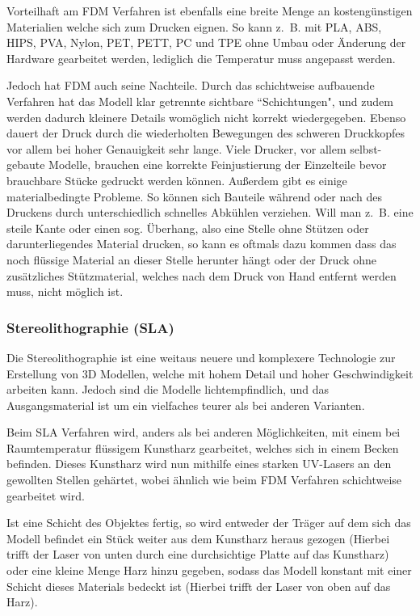 Vorteilhaft am FDM Verfahren ist ebenfalls eine breite Menge an kostengünstigen Materialien welche sich zum Drucken eignen. So kann z.~B. mit PLA, ABS, HIPS, PVA, Nylon, PET, PETT, PC und TPE \parencite{MATERIALS} ohne Umbau oder Änderung der Hardware gearbeitet werden, lediglich die Temperatur muss angepasst werden.

Jedoch hat FDM auch seine Nachteile.
Durch das schichtweise aufbauende Verfahren hat das Modell klar getrennte sichtbare \textquotedblleft Schichtungen", und zudem werden dadurch kleinere Details womöglich nicht korrekt wiedergegeben. Ebenso dauert der Druck durch die wiederholten Bewegungen des schweren Druckkopfes vor allem bei hoher Genauigkeit sehr lange. Viele Drucker, vor allem selbst-gebaute Modelle, brauchen eine korrekte Feinjustierung der Einzelteile bevor brauchbare Stücke gedruckt werden können. Außerdem gibt es einige materialbedingte Probleme. So können sich Bauteile während oder nach des Druckens durch unterschiedlich schnelles Abkühlen verziehen. Will man z.~B. eine steile Kante oder einen sog. Überhang, also eine Stelle ohne Stützen oder darunterliegendes Material drucken, so kann es oftmals dazu kommen dass das noch flüssige Material an dieser Stelle herunter hängt oder der Druck ohne zusätzliches Stützmaterial, welches nach dem Druck von Hand entfernt werden muss, nicht möglich ist. \parencite[Informationen aus:][]{FDMDetail,DRUCKVERFAHREN}

\subsubsection{Stereolithographie (SLA)}

Die Stereolithographie ist eine weitaus neuere und komplexere Technologie zur Erstellung von 3D Modellen, welche mit hohem Detail und hoher Geschwindigkeit arbeiten kann. Jedoch sind die Modelle lichtempfindlich, und das Ausgangsmaterial ist um ein vielfaches teurer als bei anderen Varianten.

Beim SLA Verfahren wird, anders als bei anderen Möglichkeiten, mit einem bei Raumtemperatur flüssigem Kunstharz gearbeitet, welches sich in einem Becken befinden.
Dieses Kunstharz wird nun mithilfe eines starken UV-Lasers an den gewollten Stellen gehärtet, wobei ähnlich wie beim FDM Verfahren schichtweise gearbeitet wird.

Ist eine Schicht des Objektes fertig, so wird entweder der Träger auf dem sich das Modell befindet ein Stück weiter aus dem Kunstharz heraus gezogen (Hierbei trifft der Laser von unten durch eine durchsichtige Platte auf das Kunstharz) oder eine kleine Menge Harz hinzu gegeben, sodass das Modell konstant mit einer Schicht dieses Materials bedeckt ist (Hierbei trifft der Laser von oben auf das Harz).

